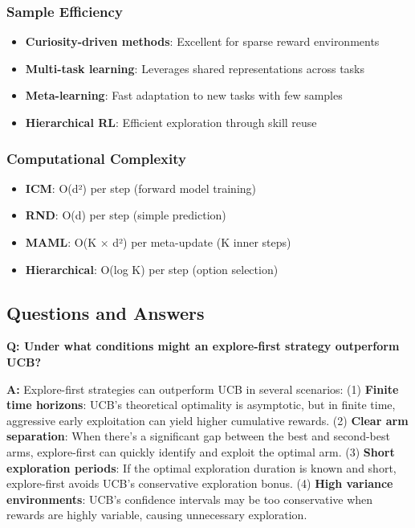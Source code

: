 \documentclass[12pt]{article}
\begin{document}
{{{\subsubsection{Sample Efficiency}

\begin{itemize}
\item \textbf{Curiosity-driven methods}: Excellent for sparse reward environments
\item \textbf{Multi-task learning}: Leverages shared representations across tasks
\item \textbf{Meta-learning}: Fast adaptation to new tasks with few samples
\item \textbf{Hierarchical RL}: Efficient exploration through skill reuse
\end{itemize}

\subsubsection{Computational Complexity}

\begin{itemize}
\item \textbf{ICM}: O(d²) per step (forward model training)
\item \textbf{RND}: O(d) per step (simple prediction)
\item \textbf{MAML}: O(K × d²) per meta-update (K inner steps)
\item \textbf{Hierarchical}: O(log K) per step (option selection)
\end{itemize}

\subsection{Questions and Answers}

\textbf{Q: Under what conditions might an explore-first strategy outperform UCB?}

\textbf{A:} Explore-first strategies can outperform UCB in several scenarios: (1) \textbf{Finite time horizons}: UCB's theoretical optimality is asymptotic, but in finite time, aggressive early exploitation can yield higher cumulative rewards. (2) \textbf{Clear arm separation}: When there's a significant gap between the best and second-best arms, explore-first can quickly identify and exploit the optimal arm. (3) \textbf{Short exploration periods}: If the optimal exploration duration is known and short, explore-first avoids UCB's conservative exploration bonus. (4) \textbf{High variance environments}: UCB's confidence intervals may be too conservative when rewards are highly variable, causing unnecessary exploration.

}}}
\end{document}
